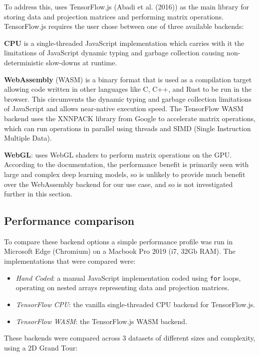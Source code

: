 To address this,  uses TensorFlow.js (Abadi et al. (2016)) as the main library for storing data and projection matrices and performing matrix operations. TensorFlow.js requires the user chose between one of three available backends:

\textbf{CPU} is a single-threaded JavaScript implementation which carries with it the limitations of JavaScript dynamic typing and garbage collection causing non-deterministic slow-downs at runtime.

\textbf{WebAssembly} (WASM) is a binary format that is used as a compilation target allowing code written in other languages like C, C++, and Rust to be run in the browser. This circumvents the dynamic typing and garbage collection limitations of JavaScript and allows near-native execution speed. The TensorFlow WASM backend uses the XNNPACK library from Google to accelerate matrix operations, which can run operations in parallel using threads and SIMD (Single Instruction Multiple Data).

\textbf{WebGL}: uses WebGL shaders to perform matrix operations on the GPU. According to the documentation, the performance benefit is primarily seen with large and complex deep learning models, so is unlikely to provide much benefit over the WebAssembly backend for our use case, and so is not investigated further in this section.

\hypertarget{performance-comparison}{%
\subsection{Performance comparison}\label{performance-comparison}}

To compare these backend options a simple performance profile was run in Microsoft Edge (Chromium) on a Macbook Pro 2019 (i7, 32Gb RAM). The implementations that were compared were:

\begin{itemize}
\tightlist
\item
  \emph{Hand Coded}: a manual JavaScript implementation coded using \texttt{for} loops, operating on nested arrays representing data and projection matrices.
\item
  \emph{TensorFlow CPU}: the vanilla single-threaded CPU backend for TensorFlow.js.
\item
  \emph{TensorFlow WASM}: the TensorFlow.js WASM backend.
\end{itemize}

These backends were compared across 3 datasets of different sizes and complexity, using a 2D Grand Tour:

